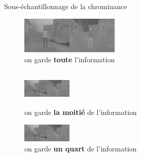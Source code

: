 \documentclass[xcolor=dvipsnames]{beamer}
\begin{document}
\begin{frame}{Sous-échantillonnage de la chrominance}
    \begin{minipage}{0.42\textwidth}
        \vspace{-9pt}
        \begin{figure}
            \centering
            \includegraphics[width=4.7cm,height=1.76cm]{cbcr.jpg}
            \caption*{\centering on garde \textbf{toute} l'information}
        \end{figure}
    \end{minipage}
    \hfill
    \begin{minipage}{0.28\textwidth}
        \begin{figure}
            \centering
            \includegraphics[width=2.35cm,height=1.76cm]{cbcr.jpg}
            \caption*{\centering on garde \textbf{la moitié} de l'information}
        \end{figure}
    \end{minipage}
    \hfill
    \begin{minipage}{0.28\textwidth}
        \begin{figure}
            \centering
            \includegraphics[width=2.35cm,height=0.88cm]{cbcr.jpg}
            \caption*{\centering on garde \textbf{un quart} de l'information}
        \end{figure}
    \end{minipage}
    \hfill

\end{frame}
\end{document}
